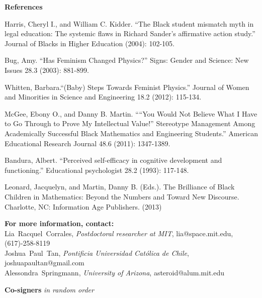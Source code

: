 \documentclass[letterpaper,11pt]{letter}
\begin{document}
\large{{\bf References}}
{\small 

\noindent [1] Harris, Cheryl I., and William C. Kidder. ``The Black student mismatch myth in legal education: The systemic flaws in Richard Sander's affirmative action study.'' Journal of Blacks in Higher Education (2004): 102-105.

\noindent [2] Bug, Amy. ``Has Feminism Changed Physics?'' Signs: Gender and Science: New Issues 28.3 (2003): 881-899.

\noindent [3] Whitten, Barbara.``(Baby) Steps Towards Feminist Physics.'' Journal of Women and Minorities in Science and Engineering 18.2 (2012): 115-134.

\noindent [4] McGee, Ebony O., and Danny B. Martin. ````You Would Not Believe What I Have to Go Through to Prove My Intellectual Value!'' Stereotype Management Among Academically Successful Black Mathematics and Engineering Students.'' American Educational Research Journal 48.6 (2011): 1347-1389.

\noindent [5] Bandura, Albert. ``Perceived self-efficacy in cognitive development and functioning.'' Educational psychologist 28.2 (1993): 117-148.

\noindent [6] Leonard, Jacquelyn, and Martin, Danny B. (Eds.). The Brilliance of Black Children in Mathematics: Beyond the Numbers and Toward New Discourse. Charlotte, NC: Information Age Publishers. (2013)
}

\vspace{0.25in}
\large{{\bf For more information, contact:}}\\
Lia~Racquel~Corrales, {\sl Postdoctoral researcher at MIT}, lia@space.mit.edu, (617)-258-8119 \\
Joshua~Paul~Tan, {\sl Pontificia Universidad Cat\'{o}lica de Chile}, joshuapaultan@gmail.com \\
Alessondra~Springmann, {\sl University of Arizona}, asteroid@alum.mit.edu

\vspace{0.25in}

\large{{\bf Co-signers}} {\small {\sl in random order}}
\begin{multicols}{2}
{\footnotesize

\noindent


}
\end{multicols}
\end{document}
